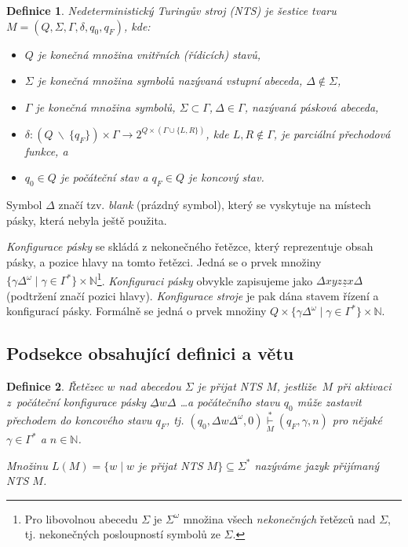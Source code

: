 \documentclass[a4paper, twocolumn, 11pt]{article}
\newtheorem{definition}{Definice}
\begin{document}
\begin{definition}\label{definicia_1}
    \emph{Nedeterministický Turingův stroj} (NTS) je šestice tvaru $M = (Q,\Sigma,\Gamma,\delta,q_0,q_F)$, kde:
    	\begin{itemize}
    		\item $Q$  je konečná množina \emph{vnitřních (řídicích) stavů},
    		\item$\Sigma$ je konečná množina symbolů nazývaná \emph{vstupní abeceda}, $\Delta \notin \Sigma$,
    		\item $\Gamma$ je konečná množina symbolů, $\Sigma \subset \Gamma$,$~\Delta \in \Gamma $, nazývaná \emph{pásková abeceda},
    		\item $\delta :(Q~\backslash~\{q_F \})\times\Gamma  \rightarrow 2^{Q\times (\Gamma \cup \{L,R\})}$, kde $L, R \notin \Gamma $, je parciální \emph{přechodová funkce}, a
    		\item $q_0 \in Q$ je \emph{počáteční stav} a $ q_F \in Q$ je \emph{koncový stav}.
    	\end{itemize}
\end{definition}
	Symbol $\Delta$ značí tzv. \emph{blank} (prázdný symbol), který se vyskytuje na místech pásky, která nebyla ještě použita.
	
    \emph{Konfigurace pásky} se skládá z nekonečného řetězce, který reprezentuje obsah pásky, a pozice hlavy na tomto řetězci. Jedná se o prvek množiny $\{\gamma\Delta^{\omega} \mid \gamma \in \Gamma^*\} \times \mathbb N $\footnote{Pro libovolnou abecedu $\Sigma$ je $\Sigma^{\omega}$ množina všech \emph{nekonečných} řetězců nad $\Sigma$, tj. nekonečných posloupností symbolů ze $\Sigma$.}.
    \emph{Konfiguraci pásky} obvykle zapisujeme jako $\Delta xyz\underline{z}x\Delta$\!\dotso (podtržení značí pozici hlavy).
    \emph{Konfigurace stroje} je pak dána stavem řízení a konfigurací pásky. Formálně se jedná o prvek množiny $Q \times \{\gamma\Delta^{\omega} \mid \gamma \in \Gamma^*\} \times \mathbb N$.
    
\subsection{Podsekce obsahující definici a větu}
    \begin{definition}\label{definicia_2}
        \emph{Řetězec $w$ nad abecedou $\Sigma$ je přijat} \emph{NTS} $M$, jestliže \,$M$\: při aktivaci z~počáteční konfigurace pásky $\underline{\Delta} w\Delta$ \dots a počátečního stavu $q_0$ může zastavit přechodem do koncového stavu $q_F$, tj. $(q_0, \Delta w \Delta^\omega,0) \overset{*}{\underset{M}\vdash} (q_F,\gamma, n)$ pro nějaké $\gamma \in \Gamma^*$ a $n \in \mathbb N$.
        
        Množinu $L (M) = \{w \mid w\!$ je\! přijat\!  NTS $\!M \}  \subseteq \Sigma^* $ nazýváme \emph{jazyk přijímaný} \emph{NTS} $M$.
        
     \end{definition}
        
\end{document}
